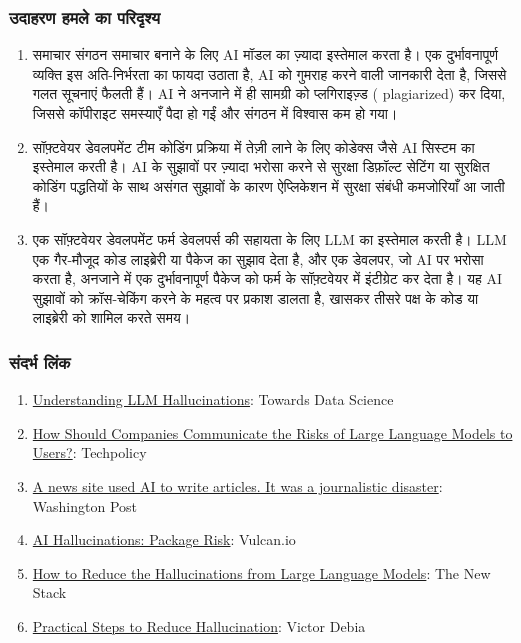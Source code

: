 \documentclass[
]{article}
\providecommand{\tightlist}{%
  \setlength{\itemsep}{0pt}\setlength{\parskip}{0pt}}
\begin{document}
\subsubsection{उदाहरण हमले का
परिदृश्य}\label{ux909ux926ux939ux930ux923-ux939ux92eux932-ux915-ux92aux930ux926ux936ux92f}

\begin{enumerate}
\def\labelenumi{\arabic{enumi}.}
\tightlist
\item
  समाचार संगठन समाचार बनाने के लिए AI मॉडल का ज़्यादा इस्तेमाल करता है। एक
  दुर्भावनापूर्ण व्यक्ति इस अति-निर्भरता का फायदा उठाता है, AI को गुमराह करने वाली
  जानकारी देता है, जिससे गलत सूचनाएं फैलती हैं। AI ने अनजाने में ही सामग्री को
  प्लगिराइज़्ड ( plagiarized) कर दिया, जिससे कॉपीराइट समस्याएँ पैदा हो गईं और
  संगठन में विश्वास कम हो गया।
\item
  सॉफ़्टवेयर डेवलपमेंट टीम कोडिंग प्रक्रिया में तेज़ी लाने के लिए कोडेक्स जैसे AI सिस्टम का
  इस्तेमाल करती है। AI के सुझावों पर ज़्यादा भरोसा करने से सुरक्षा डिफ़ॉल्ट सेटिंग या
  सुरक्षित कोडिंग पद्धतियों के साथ असंगत सुझावों के कारण ऐप्लिकेशन में सुरक्षा संबंधी
  कमजोरियाँ आ जाती हैं।
\item
  एक सॉफ़्टवेयर डेवलपमेंट फर्म डेवलपर्स की सहायता के लिए LLM का इस्तेमाल करती है। LLM
  एक गैर-मौजूद कोड लाइब्रेरी या पैकेज का सुझाव देता है, और एक डेवलपर, जो AI पर
  भरोसा करता है, अनजाने में एक दुर्भावनापूर्ण पैकेज को फर्म के सॉफ़्टवेयर में इंटीग्रेट कर
  देता है। यह AI सुझावों को क्रॉस-चेकिंग करने के महत्व पर प्रकाश डालता है, खासकर
  तीसरे पक्ष के कोड या लाइब्रेरी को शामिल करते समय।
\end{enumerate}

\subsubsection{संदर्भ लिंक}\label{ux938ux926ux930ux92d-ux932ux915}

\begin{enumerate}
\def\labelenumi{\arabic{enumi}.}
\tightlist
\item
  \href{https://towardsdatascience.com/llm-hallucinations-ec831dcd7786}{Understanding
  LLM Hallucinations}: Towards Data Science
\item
  \href{https://www.techpolicy.press/how-should-companies-communicate-the-risks-of-large-language-models-to-users/}{How
  Should Companies Communicate the Risks of Large Language Models to
  Users?}: Techpolicy
\item
  \href{https://www.washingtonpost.com/media/2023/01/17/cnet-ai-articles-journalism-corrections/}{A
  news site used AI to write articles. It was a journalistic disaster}:
  Washington Post
\item
  \href{https://vulcan.io/blog/ai-hallucinations-package-risk}{AI
  Hallucinations: Package Risk}: Vulcan.io
\item
  \href{https://thenewstack.io/how-to-reduce-the-hallucinations-from-large-language-models/}{How
  to Reduce the Hallucinations from Large Language Models}: The New
  Stack
\item
  \href{https://newsletter.victordibia.com/p/practical-steps-to-reduce-hallucination}{Practical
  Steps to Reduce Hallucination}: Victor Debia
\end{enumerate}
\end{document}
